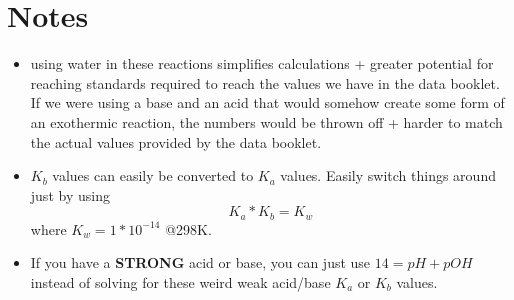 \documentclass{article}
\begin{document}
\section{Notes}
\begin{itemize}
\item using water in these reactions simplifies calculations + greater potential for reaching standards required to reach the values we have in the data booklet. If we were using a base and an acid that would somehow create some form of an exothermic reaction, the numbers would be thrown off + harder to match the actual values provided by the data booklet.
\item $K_{b}$ values can easily be converted to $K_{a}$ values. Easily switch things around just by using $$K_{a} * K_{b} = K_{w}$$ where $K_{w} = 1*10^{-14}$ @298K.
\item If you have a \textbf{STRONG} acid or base, you can just use $14 = pH + pOH$ instead of solving for these weird weak acid/base $K_{a}$ or $K_{b}$ values.
\end{itemize}
\end{document}
